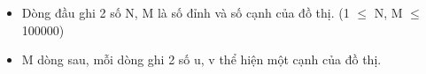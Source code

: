 \begin{itemize}
	\item     Dòng đầu ghi 2 số N, M là số đỉnh và số cạnh của đồ thị. (1  $\le$  N, M  $\le$  100000)   
\end{itemize}
\begin{itemize}
	\item     M dòng sau, mỗi dòng ghi 2 số u, v thể hiện một cạnh của đồ thị.   
\end{itemize}